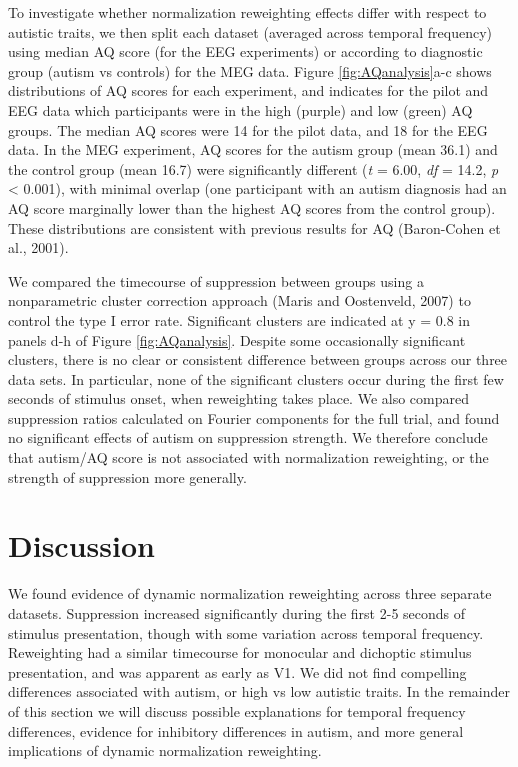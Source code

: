 \documentclass[
]{article}
\begin{document}
To investigate whether normalization reweighting effects differ with respect to autistic traits, we then split each dataset (averaged across temporal frequency) using median AQ score (for the EEG experiments) or according to diagnostic group (autism vs controls) for the MEG data. Figure \ref{fig:AQanalysis}a-c shows distributions of AQ scores for each experiment, and indicates for the pilot and EEG data which participants were in the high (purple) and low (green) AQ groups. The median AQ scores were 14 for the pilot data, and 18 for the EEG data. In the MEG experiment, AQ scores for the autism group (mean 36.1) and the control group (mean 16.7) were significantly different (\emph{t} = 6.00, \emph{df} = 14.2, \emph{p} \textless{} 0.001), with minimal overlap (one participant with an autism diagnosis had an AQ score marginally lower than the highest AQ scores from the control group). These distributions are consistent with previous results for AQ (Baron-Cohen et al., 2001).

We compared the timecourse of suppression between groups using a nonparametric cluster correction approach (Maris and Oostenveld, 2007) to control the type I error rate. Significant clusters are indicated at y = 0.8 in panels d-h of Figure \ref{fig:AQanalysis}. Despite some occasionally significant clusters, there is no clear or consistent difference between groups across our three data sets. In particular, none of the significant clusters occur during the first few seconds of stimulus onset, when reweighting takes place. We also compared suppression ratios calculated on Fourier components for the full trial, and found no significant effects of autism on suppression strength. We therefore conclude that autism/AQ score is not associated with normalization reweighting, or the strength of suppression more generally.

\hypertarget{discussion}{%
\section{Discussion}\label{discussion}}

We found evidence of dynamic normalization reweighting across three separate datasets. Suppression increased significantly during the first 2-5 seconds of stimulus presentation, though with some variation across temporal frequency. Reweighting had a similar timecourse for monocular and dichoptic stimulus presentation, and was apparent as early as V1. We did not find compelling differences associated with autism, or high vs low autistic traits. In the remainder of this section we will discuss possible explanations for temporal frequency differences, evidence for inhibitory differences in autism, and more general implications of dynamic normalization reweighting.
\end{document}
